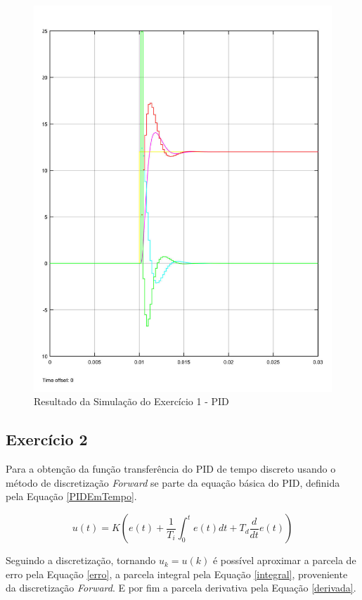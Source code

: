 	\begin{figure}[H]
		\centering
		\includegraphics[scale = .7]{Imagens/PIDExercicioI.pdf}
		\caption{Resultado da Simulação do Exercício 1 - PID}
		\label{fig:PIDExercicioI}
	\end{figure}
	
	
\subsection{Exercício 2}
	Para a obtenção da função transferência do PID de tempo discreto usando o método de discretização \emph{Forward} se parte da equação básica do PID, definida pela Equação \ref{PIDEmTempo}.
	
	\begin{equation}
		u(t) = K \left( e(t) + \frac{1}{T_{i}} \int_0^t e(t) dt + T_d \frac{d}{dt} e(t) \right) 
		\label{PIDEmTempo}
	\end{equation}
	
	Seguindo a discretização, tornando $u_k = u(k)$ é possível aproximar a parcela de erro pela Equação \ref{erro}, a parcela integral pela Equação \ref{integral}, proveniente da discretização \emph{Forward}. E por fim a parcela derivativa pela Equação \ref{derivada}.
	
